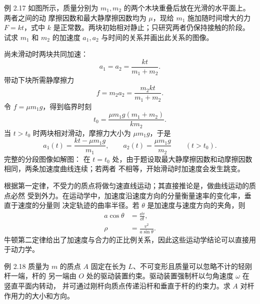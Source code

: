 \begin{origexamplebox}{例 2.17}
如图所示，质量分别为 $m_1,m_2$ 的两个木块重叠后放在光滑的水平面上。两者之间的动
摩擦因数和最大静摩擦因数均为 $\mu$，现给 $m_1$ 施加随时间增大的力 $F=kt$，式中 $k$
是正常数。两块初始相对静止；只研究两者仍保持接触的阶段。试求
$m_1$ 和 $m_2$ 的加速度 $a_1,a_2$ 与时间的关系并画出此关系的图像。
\probdiagTwoSeventeen
\end{origexamplebox}

\begin{xesolution}
尚未滑动时两块共同加速：
\[
 a_1=a_2=\frac{kt}{m_1+m_2}.
\]
带动下块所需静摩擦力
\[
 f=m_2a_2=\frac{m_2kt}{m_1+m_2}.
\]
令 $f=\mu m_1g$，得到临界时刻
\[
 \boxed{t_0=\frac{\mu m_1g(m_1+m_2)}{km_2}}.
\]
当 $t>t_0$ 时两块相对滑动，摩擦力大小为 $\mu m_1g$，于是
\[
 \boxed{
 a_1(t)=\frac{kt-\mu m_1g}{m_1},
 \qquad
 a_2(t)=\frac{\mu m_1g}{m_2}}
 \qquad(t>t_0).
\]
完整的分段图像如解图：
\soldiagTwoSeventeen
在 $t=t_0$ 处，由于题设取最大静摩擦因数和动摩擦因数相同，两条加速度曲线连续；若两者
不相等，开始滑动时加速度会发生跳变。
\end{xesolution}

根据第一定律，不受力的质点将做匀速直线运动；其直接推论是，做曲线运动的质点必然
受到外力。在运动学中，加速度沿速度方向的分量衡量速率的变化率，垂直于速度的分量则
决定轨迹的曲率半径。若 $\theta$ 是加速度与速度方向的夹角，则
\begin{align}
 a\cos\theta&=\frac{\dd v}{\dd t}, \tag{2.10}\\
 \rho&=\frac{v^2}{a\sin\theta}. \tag{2.11}
\end{align}
牛顿第二定律给出了加速度与合力的正比例关系，因此这些运动学结论可以直接用于动力学。

\begin{origexamplebox}{例 2.18}
质量为 $m$ 的质点 $A$ 固定在长为 $L$、不可变形且质量可以忽略不计的轻刚杆一端，杆的
另一端由 $O$ 处的驱动装置约束。驱动装置强制杆以匀角速度 $\omega$ 在竖直平面内转动，
并可通过刚杆向质点传递沿杆和垂直于杆的约束力。求 $A$ 对杆作用力的大小和方向。
\probdiagTwoEighteen
\end{origexamplebox}

